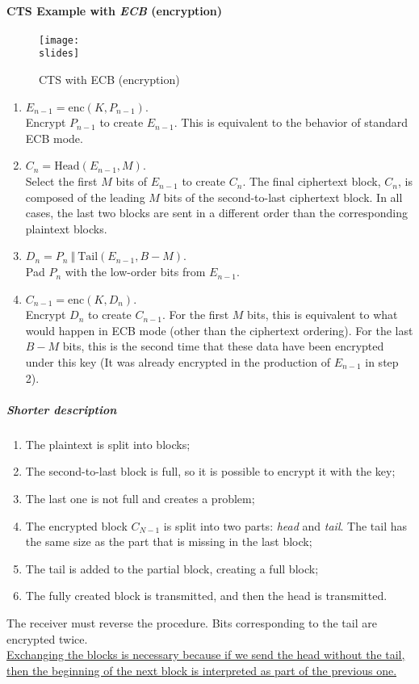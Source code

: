 \paragraph{CTS Example with \textit{ECB} (encryption)}
\begin{figure}[h]
    \centering
    \texttt{[image: \\slides]}
    \caption{CTS with ECB (encryption)}
\end{figure}
\begin{enumerate}
    \item \(E_{n-1} = \text{enc}(K, P_{n-1})\).\\
          Encrypt \(P_{n-1}\) to create \(E_{n-1}\). This is equivalent to the behavior of standard ECB mode.
    \item \(C_n = \text{Head}(E_{n-1}, M)\).\\
          Select the first \(M\) bits of \(E_{n-1}\) to create \(C_n\). The final ciphertext block, \(C_n\), is composed of the leading \(M\) bits of the second-to-last ciphertext block. In all cases, the last two blocks are sent in a different order than the corresponding plaintext blocks.
    \item \(D_n = P_n  \ \Vert \  \text{Tail}(E_{n-1}, B-M)\).\\
          Pad \(P_n\) with the low-order bits from \(E_{n-1}\).
    \item \(C_{n-1} = \text{enc}(K, D_n)\).\\
          Encrypt \(D_n\) to create \(C_{n-1}\). For the first \(M\) bits, this is equivalent to what would happen in ECB mode (other than the ciphertext ordering). For the last \(B-M\) bits, this is the second time that these data have been encrypted under this key (It was already encrypted in the production of \(E_{n-1}\) in step 2).
\end{enumerate}



\subparagraph{Shorter description}
\begin{enumerate}
    \item The plaintext is split into blocks;
    \item The second-to-last block is full, so it is possible to encrypt it with the key;
    \item The last one is not full and creates a problem;
    \item The encrypted block $C_{N-1}$ is split into two parts: \textit{head} and \textit{tail}. The tail has the same size as the part that is missing in the last block;
    \item The tail is added to the partial block, creating a full block;
    \item The fully created block is transmitted, and then the head is transmitted.
\end{enumerate}
The receiver must reverse the procedure. Bits corresponding to the tail are encrypted twice.\\ \ul{Exchanging the blocks is necessary because if we send the head without the tail, then the beginning of the next block is interpreted as part of the previous one.}


